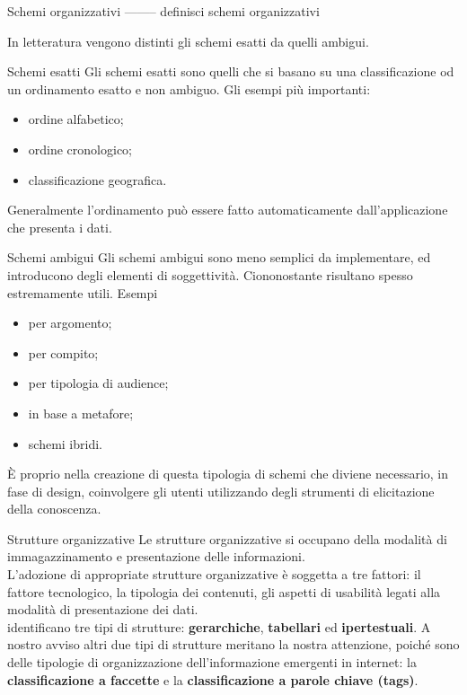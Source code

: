 \documentclass[pdf,mpa]{prosper}
\begin{document}
\begin{slide}{Schemi organizzativi}
-------- definisci schemi organizzativi

In letteratura \citep{RosenfeldMorville1998} vengono distinti gli schemi esatti da quelli ambigui.

\end{slide}

\begin{slide}{Schemi esatti}
Gli schemi esatti sono quelli che si basano su una classificazione od un ordinamento esatto e non ambiguo. Gli esempi più importanti:
\begin{itemize}
\item ordine alfabetico;
\item ordine cronologico;
\item classificazione geografica.
\end{itemize}
Generalmente l'ordinamento può essere fatto automaticamente dall'applicazione che presenta i dati.
\end{slide}

\begin{slide}{Schemi ambigui}
Gli schemi ambigui sono meno semplici da implementare, ed introducono degli elementi di soggettività. Ciononostante risultano spesso estremamente utili. Esempi
\begin{itemize}
\item per argomento;
\item per compito;
\item per tipologia di audience;
\item in base a metafore;
\item schemi ibridi.
\end{itemize}
È proprio nella creazione di questa tipologia di schemi che diviene necessario, in fase di design, coinvolgere gli utenti utilizzando degli strumenti di elicitazione della conoscenza.
\end{slide}

\begin{slide}{Strutture organizzative}
Le strutture organizzative si occupano della modalità di immagazzinamento e presentazione delle informazioni.\\
L'adozione di appropriate strutture organizzative è soggetta a tre fattori: il fattore tecnologico, la tipologia dei contenuti, gli aspetti di usabilità legati alla modalità di presentazione dei dati.\\

\cite{RosenfeldMorville1998} identificano tre tipi di strutture: \textbf{gerarchiche}, \textbf{tabellari} ed \textbf{ipertestuali}. A nostro avviso altri due tipi di strutture  meritano la nostra attenzione, poiché sono delle tipologie di organizzazione dell'informazione emergenti in internet: la \textbf{classificazione a faccette} e la \textbf{classificazione a parole chiave (tags)}.
\end{slide}
\end{document}
